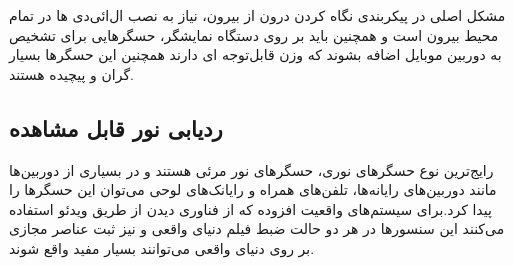 مشکل اصلی در پیکربندی نگاه کردن درون از بیرون، نیاز به نصب ال‌ائی‌دی ها در تمام محیط بیرون است و همچنین باید بر روی دستگاه نمایشگر، حسگرهایی برای تشخیص به دوربین موبایل اضافه بشوند که وزن قابل‌توجه ای دارند همچنین این حسگرها بسیار گران و پیچیده هستند.

\subsection{ردیابی نور قابل مشاهده\protect{}}

رایج‌ترین نوع حسگرهای نوری، حسگرهای نور مرئی هستند و در بسیاری از دوربین‌ها مانند دوربین‌های رایانه‌ها، تلفن‌های همراه و رایانک‌های لوحی می‌توان این حسگرها را پیدا کرد.برای سیستم‌های واقعیت افزوده که از فناوری دیدن از طریق ویدئو استفاده می‌کنند این سنسورها در هر دو حالت ضبط فیلم دنیای واقعی و نیز ثبت عناصر مجازی بر روی دنیای واقعی می‌توانند بسیار مفید واقع شوند.


